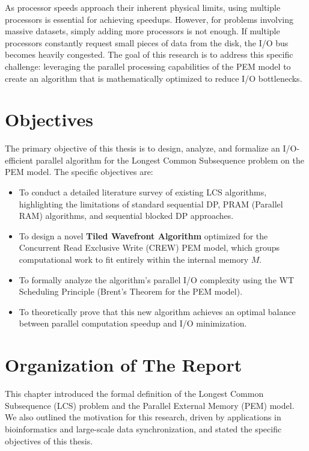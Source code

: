 As processor speeds approach their inherent physical limits, using multiple processors is essential for achieving speedups. However, for problems involving massive datasets, simply adding more processors is not enough. If multiple processors constantly request small pieces of data from the disk, the I/O bus becomes heavily congested. The goal of this research is to address this specific challenge: leveraging the parallel processing capabilities of the PEM model to create an algorithm that is mathematically optimized to reduce I/O bottlenecks.

\section{Objectives}
The primary objective of this thesis is to design, analyze, and formalize an I/O-efficient parallel algorithm for the Longest Common Subsequence problem on the PEM model. The specific objectives are:
\begin{itemize}
    \item To conduct a detailed literature survey of existing LCS algorithms, highlighting the limitations of standard sequential DP, PRAM (Parallel RAM) algorithms, and sequential blocked DP approaches.
    \item To design a novel \textbf{Tiled Wavefront Algorithm} optimized for the Concurrent Read Exclusive Write (CREW) PEM model, which groups computational work to fit entirely within the internal memory $M$.
    \item To formally analyze the algorithm's parallel I/O complexity using the WT Scheduling Principle (Brent's Theorem for the PEM model).
    \item To theoretically prove that this new algorithm achieves an optimal balance between parallel computation speedup and I/O minimization.
\end{itemize}

\section{Organization of The Report}
This chapter introduced the formal definition of the Longest Common Subsequence (LCS) problem and the Parallel External Memory (PEM) model. We also outlined the motivation for this research, driven by applications in bioinformatics and large-scale data synchronization, and stated the specific objectives of this thesis. 


